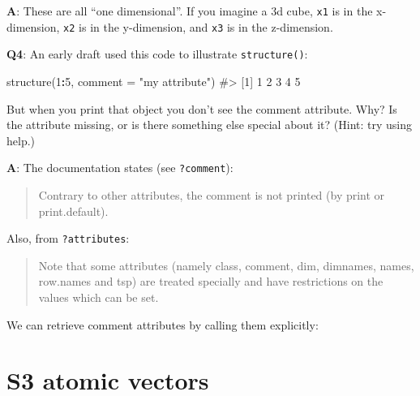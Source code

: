\documentclass[
]{krantz}
\makeatletter
\newenvironment{Shaded}{\begin{snugshade}}{\end{snugshade}}
\newcommand{\CommentTok}[1]{\textcolor[rgb]{0.56,0.35,0.01}{\textit{#1}}}
\newcommand{\DataTypeTok}[1]{\textcolor[rgb]{0.13,0.29,0.53}{#1}}
\newcommand{\DecValTok}[1]{\textcolor[rgb]{0.00,0.00,0.81}{#1}}
\newcommand{\KeywordTok}[1]{\textcolor[rgb]{0.13,0.29,0.53}{\textbf{#1}}}
\newcommand{\NormalTok}[1]{#1}
\newcommand{\OperatorTok}[1]{\textcolor[rgb]{0.81,0.36,0.00}{\textbf{#1}}}
\newcommand{\StringTok}[1]{\textcolor[rgb]{0.31,0.60,0.02}{#1}}
\newenvironment{kframe}{%
\medskip{}
\setlength{\fboxsep}{.8em}
 \def\at@end@of@kframe{}%
 \ifinner\ifhmode%
  \def\at@end@of@kframe{\end{minipage}}%
  \begin{minipage}{\columnwidth}%
 \fi\fi%
 \def\FrameCommand##1{\hskip\@totalleftmargin \hskip-\fboxsep
 \colorbox{shadecolor}{##1}\hskip-\fboxsep
     \hskip-\linewidth \hskip-\@totalleftmargin \hskip\columnwidth}%
 \MakeFramed {\advance\hsize-\width
   \@totalleftmargin\z@ \linewidth\hsize
   \@setminipage}}%
 {\par\unskip\endMakeFramed%
 \at@end@of@kframe}
\renewenvironment{Shaded}{\begin{kframe}}{\end{kframe}}
\renewcommand{\KeywordTok} [1]{\textcolor[rgb]{0.00,0.44,0.13}{{#1}}}
\renewcommand{\DataTypeTok}[1]{\textcolor[rgb]{0.56,0.13,0.00}{{#1}}}
\renewcommand{\DecValTok}  [1]{\textcolor[rgb]{0.25,0.63,0.44}{{#1}}}
\renewcommand{\StringTok}  [1]{\textcolor[rgb]{0.25,0.44,0.63}{{#1}}}
\renewcommand{\CommentTok} [1]{\textcolor[rgb]{0.38,0.63,0.69}{{#1}}}
\renewcommand{\NormalTok}  [1]{{#1}}
\makeatother
\begin{document}
\textbf{{A}}: These are all ``one dimensional''. If you imagine a 3d cube, \texttt{x1} is in the x-dimension, \texttt{x2} is in the y-dimension, and \texttt{x3} is in the z-dimension.

\textbf{{Q4}}: An early draft used this code to illustrate \texttt{structure()}:

\begin{Shaded}
\begin{Highlighting}[]
\KeywordTok{structure}\NormalTok{(}\DecValTok{1}\OperatorTok{:}\DecValTok{5}\NormalTok{, }\DataTypeTok{comment =} \StringTok{"my attribute"}\NormalTok{)}
\CommentTok{#> [1] 1 2 3 4 5}
\end{Highlighting}
\end{Shaded}

But when you print that object you don't see the comment attribute. Why? Is the attribute missing, or is there something else special about it? (Hint: try using help.)

\textbf{{A}}: The documentation states (see \texttt{?comment}):

\begin{quote}
Contrary to other attributes, the comment is not printed (by print or print.default).
\end{quote}

Also, from \texttt{?attributes}:

\begin{quote}
Note that some attributes (namely class, comment, dim, dimnames, names, row.names and tsp) are treated specially and have restrictions on the values which can be set.
\end{quote}

We can retrieve comment attributes by calling them explicitly:

\begin{Shaded}
\end{Shaded}

\hypertarget{s3-atomic-vectors}{%
\section{S3 atomic vectors}\label{s3-atomic-vectors}}
\end{document}

